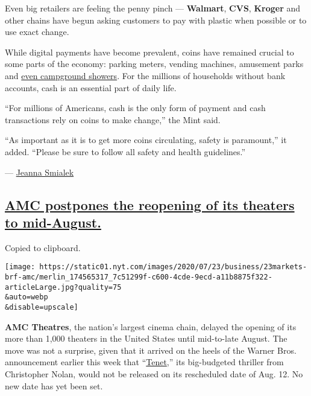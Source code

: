 Even big retailers are feeling the penny pinch --- \textbf{Walmart},
\textbf{CVS}, \textbf{Kroger} and other chains have begun asking
customers to pay with plastic when possible or to use exact change.

While digital payments have become prevalent, coins have remained
crucial to some parts of the economy: parking meters, vending machines,
amusement parks and
\href{https://cluballiance.aaa.com/the-extra-mile/articles/prepare/travel/10-tips-for-your-next-car-camping-adventure?rdl=midatlantic.aaa.com\&et_cid=sfmc:email:weekly-tem-email:062420-prepare-travel-10-tips-for-your-next-car-camping-adventure:\&promo=\&utm_source=sfmc\&utm_medium=email\&utm_campaign=weekly-tem-email\&utm_content=062420-prepare-travel-10-tips-for-your-next-car-camping-adventure\&utm_term=\&et_cid=719079\&et_rid=15517979\&linkid=A1_10-tips-for-your-next-car-camping-adventure_BTN\&et_jid=ET_EMAIL}{even
campground showers}. For the millions of households without bank
accounts, cash is an essential part of daily life.

``For millions of Americans, cash is the only form of payment and cash
transactions rely on coins to make change,'' the Mint said.

``As important as it is to get more coins circulating, safety is
paramount,'' it added. ``Please be sure to follow all safety and health
guidelines.''

--- \href{https://www.nytimes.com/by/jeanna-smialek}{Jeanna Smialek}

\hypertarget{amc-postpones-the-reopening-of-its-theaters-to-mid-august}{%
\subsection{\texorpdfstring{\protect\hyperlink{amc-postpones-the-reopening-of-its-theaters-to-mid-august}{AMC
postpones the reopening of its theaters to
mid-August.}}{AMC postpones the reopening of its theaters to mid-August.}}\label{amc-postpones-the-reopening-of-its-theaters-to-mid-august}}

Copied to clipboard.

\texttt{[image: https://static01.nyt.com/images/2020/07/23/business/23markets-brf-amc/merlin\_174565317\_7c51299f-c600-4cde-9ecd-a11b8875f322-articleLarge.jpg?quality=75\\\&auto=webp\\\&disable=upscale]}

\textbf{AMC Theatres}, the nation's largest cinema chain, delayed the
opening of its more than 1,000 theaters in the United States until
mid-to-late August. The move was not a surprise, given that it arrived
on the heels of the Warner Bros. announcement earlier this week that
``\href{https://www.nytimes.com/live/2020/07/20/business/stock-market-today-coronavirus\#warner-bros-backs-off-its-aug-12-release-date-for-tenet}{Tenet},''
its big-budgeted thriller from Christopher Nolan, would not be released
on its rescheduled date of Aug. 12. No new date has yet been set.

